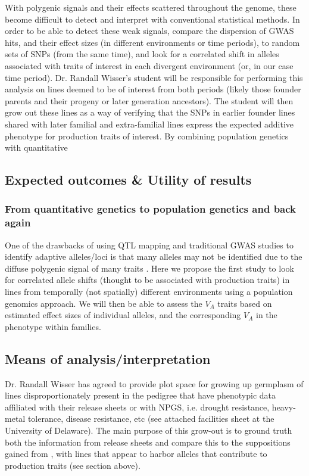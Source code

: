 \documentclass[draft,12pt]{article}
\begin{document}
With polygenic signals and their effects scattered throughout the genome, these become difficult to detect and interpret with conventional statistical methods. 
In order to be able to detect these weak signals, \cite{Berg:2014bs} compare the dispersion of GWAS hits, and their effect sizes (in different environments or time periods), to random sets of SNPs (from the same time), and look for a correlated shift in alleles associated with traits of interest in each divergent environment (or, in our case time period).
Dr. Randall Wisser's student will be responsible for performing this analysis on lines deemed to be of interest from both periods (likely those founder parents and their progeny or later generation ancestors). 
The student will then grow out these lines as a way of verifying that the SNPs in earlier founder lines shared with later familial and extra-familial lines express the expected additive phenotype for production traits of interest. 
By combining population genetics with quantitative 



\subsection*{Expected outcomes \& Utility of results}


\subsubsection*{From quantitative genetics to population genetics and back again}
One of the drawbacks of using QTL mapping and traditional GWAS studies to identify adaptive alleles/loci is that many alleles may not be identified due to the diffuse polygenic signal of many traits \cite{Rockman:2011ej, Berg:2014bs}. 
Here we propose the first study to look for correlated allele shifts (thought to be associated with production traits) in lines from temporally (not spatially) different environments using a population genomics approach.
We will then be able to assess the $V_{A}$ traits based on estimated effect sizes of individual alleles, and the corresponding $V_{A}$ in the phenotype within families.


\subsection*{Means of analysis/interpretation}
Dr. Randall Wisser has agreed to provide plot space for growing up germplasm of lines disproportionately present in the pedigree that have phenotypic data affiliated with their release sheets or with NPGS, i.e. drought resistance, heavy-metal tolerance, disease resistance, etc (see attached facilities sheet at the University of Delaware). 
The main purpose of this grow-out is to ground truth both the information from release sheets and compare this to the suppositions gained from \citep{Berg:2014bs}, with lines that appear to harbor alleles that contribute to production traits (see section above).
\end{document}
